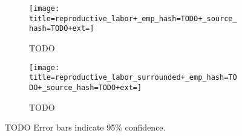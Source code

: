 \begin{figure}[!htbp]
\begin{center}

\begin{subfigure}[b]{\columnwidth}
\texttt{[image: title=reproductive\_labor+\_emp\_hash=TODO+\_source\_hash=TODO+ext=]}
\caption{TODO}
\label{fig:TODO}
\end{subfigure}

\begin{subfigure}[b]{\columnwidth}
\texttt{[image: title=reproductive\_labor\_surrounded+\_emp\_hash=TODO+\_source\_hash=TODO+ext=]}
\caption{TODO}
\label{fig:TODO}
\end{subfigure}

\caption{
TODO
Error bars indicate 95\% confidence.
}
\label{fig:reproductive_labor}
\end{center}
\end{figure}
